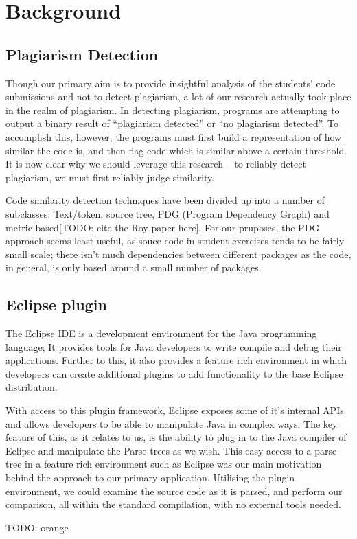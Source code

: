 \chapter{Background}

\label{Background}


\section{Plagiarism Detection}

Though our primary aim is to provide insightful analysis of the students' code 
submissions and not to detect plagiarism, a lot of our research actually took 
place in the realm of plagiarism. In detecting plagiarism, programs are attempting
to output a binary result of ``plagiarism detected'' or ``no plagiarism detected''.
To accomplish this, however, the programs must first build a representation of 
how similar the code is, and then flag code which is similar above a certain threshold.
It is now clear why we should leverage this research -- to reliably detect plagiarism,
we must first reliably judge similarity.

Code similarity detection techniques have been divided up into a number of subclasses:
Text/token, source tree, PDG (Program Dependency Graph) and metric based[TODO: cite the Roy paper here]. 
For our pruposes, the PDG approach seems least useful, as souce code in student exercises
tends to be fairly small scale; there isn't much dependencies between different
packages as the code, in general, is only based around a small number of packages.

\section{Eclipse plugin}

The Eclipse IDE is a development environment for the Java programming language;
It provides tools for Java developers to write compile and debug their applications.
Further to this, it also provides a feature rich environment in which developers
can create additional plugins to add functionality to the base Eclipse distribution.

With access to this plugin framework, Eclipse exposes some of it's internal APIs
and allows developers to be able to manipulate Java in complex ways. The key feature
of this, as it relates to us, is the ability to plug in to the Java compiler of Eclipse
and manipulate the Parse trees as we wish. This easy access to a parse tree in a
feature rich environment such as Eclipse was our main motivation behind the approach
to our primary application. Utilising the plugin environment, we could examine the
source code as it is parsed, and perform our comparison, all within the standard
compilation, with no external tools needed.

TODO: orange

